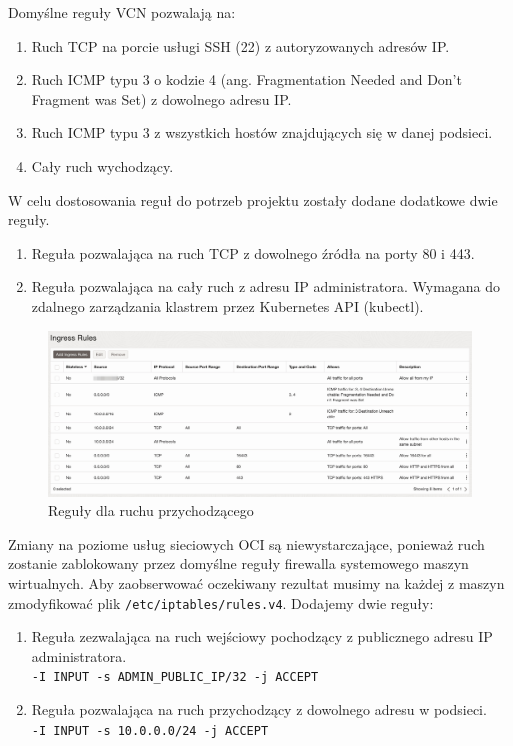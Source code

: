 Domyślne reguły VCN\cite{oci-security-lists} pozwalają na:
\begin{enumerate}
    \item Ruch TCP na porcie usługi SSH (22) z autoryzowanych adresów IP.
    \item Ruch ICMP typu 3 o kodzie 4 (ang. Fragmentation Needed and Don't Fragment was Set) z dowolnego adresu IP.
    \item Ruch ICMP typu 3 z wszystkich hostów znajdujących się w danej podsieci.
    \item Cały ruch wychodzący.
\end{enumerate}

W celu dostosowania reguł do potrzeb projektu zostały dodane dodatkowe dwie reguły.
\begin{enumerate}
    \item Reguła pozwalająca na ruch TCP z dowolnego źródła na porty 80 i 443.
    \item Reguła pozwalająca na cały ruch z adresu IP administratora. Wymagana do zdalnego zarządzania klastrem przez Kubernetes API (kubectl).
\end{enumerate}

\begin{figure}[H]
    \centering
    \includegraphics[width=\textwidth]{img/oci-subnet-ingress-rules}
    \caption{Reguły dla ruchu przychodzącego}
    \label{fig:oci-subnet-ingress-rules}
\end{figure}

Zmiany na poziome usług sieciowych OCI są niewystarczające, ponieważ ruch zostanie zablokowany przez domyślne reguły firewalla systemowego maszyn wirtualnych.
Aby zaobserwować oczekiwany rezultat musimy na każdej z maszyn zmodyfikować plik \texttt{/etc/iptables/rules.v4}. Dodajemy dwie reguły:
\begin{enumerate}
    \item Reguła zezwalająca na ruch wejściowy pochodzący z publicznego adresu IP administratora.\\
    \texttt{-I INPUT -s ADMIN_PUBLIC_IP/32 -j ACCEPT}
    \item Reguła pozwalająca na ruch przychodzący z dowolnego adresu w podsieci.\\
    \texttt{-I INPUT -s 10.0.0.0/24 -j ACCEPT}
\end{enumerate}

